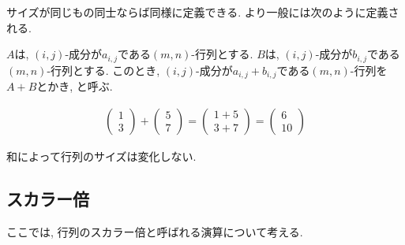 サイズが同じもの同士ならば同様に定義できる.
より一般には次のように定義される.
\begin{definition}
  \label{def:op:sum}
  $A$は, $(i,j)$-成分が$a_{i,j}$である$(m,n)$-行列とする.
  $B$は, $(i,j)$-成分が$b_{i,j}$である$(m,n)$-行列とする.
  このとき,
  $(i,j)$-成分が$a_{i,j}+b_{i,j}$である$(m,n)$-行列を$A+B$とかき,
  と呼ぶ.  
\end{definition}
\begin{example}
  \begin{align*}
  \begin{pmatrix}
    1\\3
  \end{pmatrix}+
  \begin{pmatrix}
    5\\7
  \end{pmatrix}
 =
  \begin{pmatrix}
    1+5\\3+7
  \end{pmatrix}
 =
  \begin{pmatrix}
    6\\10
  \end{pmatrix}
  \end{align*}  
\end{example}
\begin{remark}
  和によって行列のサイズは変化しない.
\end{remark}



\subsection{スカラー倍}
ここでは, 行列のスカラー倍と呼ばれる演算について考える.

